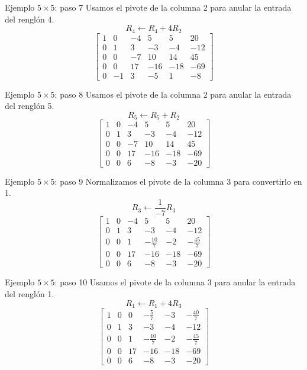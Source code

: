 \documentclass[aspectratio=169,9pt]{beamer}
\theoremstyle{remark}
\begin{document}
\begin{frame}[t]{Ejemplo $5\times5$: paso 7}
Usamos el pivote de la columna 2 para anular la entrada del renglón 4.
\[
R_{4}\leftarrow R_{4}+4R_{2}
\]
\[
\left[\begin{array}{ccccc|c}
1 & 0 & -4 & 5 & 5 & 20\\
0 & 1 & 3 & -3 & -4 & -12\\
0 & 0 & -7 & 10 & 14 & 45\\
0 & 0 & 17 & -16 & -18 & -69\\
0 & -1 & 3 & -5 & 1 & -8
\end{array}\right]
\]
\end{frame}
\begin{frame}[t]{Ejemplo $5\times5$: paso 8}
Usamos el pivote de la columna 2 para anular la entrada del renglón 5.
\[
R_{5}\leftarrow R_{5}+R_{2}
\]
\[
\left[\begin{array}{ccccc|c}
1 & 0 & -4 & 5 & 5 & 20\\
0 & 1 & 3 & -3 & -4 & -12\\
0 & 0 & -7 & 10 & 14 & 45\\
0 & 0 & 17 & -16 & -18 & -69\\
0 & 0 & 6 & -8 & -3 & -20
\end{array}\right]
\]
\end{frame}
\begin{frame}[t]{Ejemplo $5\times5$: paso 9}
Normalizamos el pivote de la columna 3 para convertirlo en 1.
\[
R_{3}\leftarrow \frac{1}{-7}R_{3}
\]
\[
\left[\begin{array}{ccccc|c}
1 & 0 & -4 & 5 & 5 & 20\\
0 & 1 & 3 & -3 & -4 & -12\\
0 & 0 & 1 & - \frac{10}{7} & -2 & - \frac{45}{7}\\
0 & 0 & 17 & -16 & -18 & -69\\
0 & 0 & 6 & -8 & -3 & -20
\end{array}\right]
\]
\end{frame}
\begin{frame}[t]{Ejemplo $5\times5$: paso 10}
Usamos el pivote de la columna 3 para anular la entrada del renglón 1.
\[
R_{1}\leftarrow R_{1}+4R_{3}
\]
\[
\left[\begin{array}{ccccc|c}
1 & 0 & 0 & - \frac{5}{7} & -3 & - \frac{40}{7}\\
0 & 1 & 3 & -3 & -4 & -12\\
0 & 0 & 1 & - \frac{10}{7} & -2 & - \frac{45}{7}\\
0 & 0 & 17 & -16 & -18 & -69\\
0 & 0 & 6 & -8 & -3 & -20
\end{array}\right]
\]
\end{frame}
\end{document}
